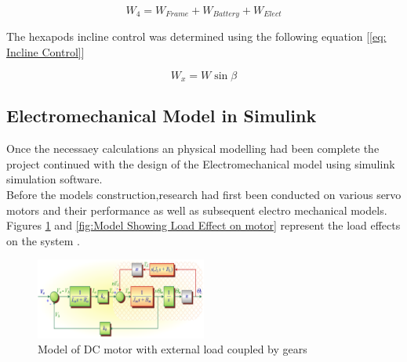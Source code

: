 \begin{equation} \label{eq: Weight}
W_4 = W_{Frame}+W_{Battery}+W_{Elect}
\end{equation}


The hexapods incline control was determined using the following equation [\ref{eq: Incline Control}]

\begin{equation} \label{eq: Incline Control}
W_x = W \sin \beta
\end{equation}




\subsection{Electromechanical Model in Simulink}
Once the necessaey calculations an physical modelling had been complete the project continued with the design of the Electromechanical model using simulink simulation software.\\

Before the models construction,research had first been conducted on various servo motors and their performance as well as subsequent electro mechanical models. Figures \ref{fig:Model of DC motor with external load coupled by gears} and \ref{fig:Model Showing Load Effect on motor} represent the load effects on the system .\\

\begin{figure}[h]
 \centering
   \includegraphics[width = 0.5\textwidth]{figures/5.png}                \caption{Model of DC motor with external load coupled by gears}
   \label{fig:Model of DC motor with external load coupled by gears}
\end{figure}


